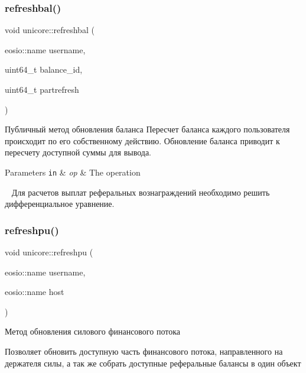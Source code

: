 \subsubsection{\texorpdfstring{refreshbal()}{refreshbal()}}
{\footnotesize\ttfamily void unicore\+::refreshbal (\begin{DoxyParamCaption}\item[{eosio\+::name}]{username,  }\item[{uint64\+\_\+t}]{balance\+\_\+id,  }\item[{uint64\+\_\+t}]{partrefresh }\end{DoxyParamCaption})}



Публичный метод обновления баланса Пересчет баланса каждого пользователя происходит по его собственному действию. Обновление баланса приводит к пересчету доступной суммы для вывода. 


\begin{DoxyParams}[1]{Parameters}
\mbox{\tt in}  & {\em op} & The operation \\
\hline
\end{DoxyParams}
~\newline
Для расчетов выплат реферальных вознаграждений необходимо решить дифференциальное уравнение.\mbox{\label{classunicore_a00ca80d8fa12bd41448d55cd82c5cd60}} 
\subsubsection{\texorpdfstring{refreshpu()}{refreshpu()}}
{\footnotesize\ttfamily void unicore\+::refreshpu (\begin{DoxyParamCaption}\item[{eosio\+::name}]{username,  }\item[{eosio\+::name}]{host }\end{DoxyParamCaption})}



Метод обновления силового финансового потока 

Позволяет обновить доступную часть финансового потока, направленного на держателя силы, а так же собрать доступные реферальные балансы в один объект \mbox{\label{classunicore_a790c1a22331df2bd9e7f9b9094de7dfb}} 
